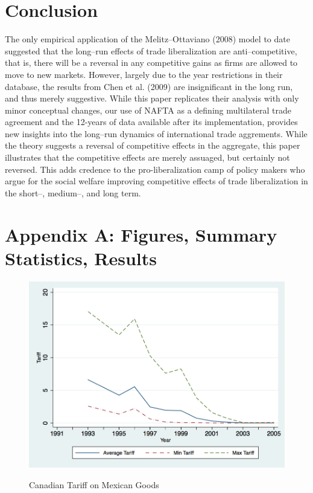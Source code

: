 \documentclass[a4paper,12pt]{article}
\begin{document}
{\section{Conclusion}\label{sec:conc}
The only empirical application of the Melitz--Ottaviano (2008) model to date suggested that the long--run effects of trade liberalization are anti--competitive, that is, there will be a reversal in any competitive gains as firms are allowed to move to new markets. However, largely due to the year restrictions in their database, the results from Chen et al. (2009) are insignificant in the long run, and thus merely suggestive. While this paper replicates their analysis with only minor conceptual changes, our use of NAFTA as a defining multilateral trade agreement and the 12-years of data available after its implementation, provides new insights into the long--run dynamics of international trade aggrements. While the theory suggests a reversal of competitive effects in the aggregate, this paper illustrates that the competitive effects are merely assuaged, but certainly not reversed. This adds credence to the pro-liberalization camp of policy makers who argue for the social welfare improving competitive effects of trade liberalization in the short--, medium--, and long term.
 
\newpage



\newpage

\section{Appendix A: Figures, Summary Statistics, Results}

\begin{figure}[htpb]\centering
\caption{Canadian Tariff on Mexican Goods}\vspace{0.2cm}
\includegraphics[scale=0.35]{can_mex_tariff}
\label{fig:can_mex}
\end{figure} 

}
\end{document}
